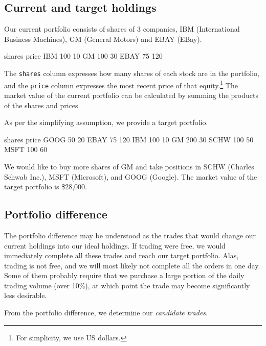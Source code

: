\documentclass{article}
\begin{document}
\subsection{Current and target holdings}

Our current portfolio consists of shares of
3 companies, IBM (International Business
Machines), GM (General Motors) and EBAY (EBay).

\begin{Schunk}
\begin{Soutput}
     shares price
IBM     100    10
GM      100    30
EBAY     75   120
\end{Soutput}
\end{Schunk}

The \texttt{shares} column expresses how many shares of each stock are
in the portfolio, and the \texttt{price} column expresses the most
recent price of that equity.\footnote{For simplicity, we use US
dollars.}  The market value of the current portfolio can be calculated
by summing the products of the shares and prices.

As per the simplifying assumption, we provide a target portfolio.

\begin{Schunk}
\begin{Soutput}
     shares price
GOOG     50    20
EBAY     75   120
IBM     100    10
GM      200    30
SCHW    100    50
MSFT    100    60
\end{Soutput}
\end{Schunk}

We would like to buy more shares of GM and take positions in SCHW
(Charles Schwab Inc.), MSFT (Microsoft), and GOOG (Google).  The
market value of the target portfolio is
\$28,000.
 
\subsection{Portfolio difference}

The portfolio difference may be understood as the trades that would
change our current holdings into our ideal holdings. If trading were
free, we would immediately complete all these trades and reach our
target portfolio.  Alas, trading is not free, and we will most likely
not complete all the orders in one day.  Some of them probably require
that we purchase a large portion of the daily trading volume (over
10\%), at which point the trade may become significantly less
desirable.

From the portfolio difference, we determine our \emph{candidate
trades}.
\end{document}

